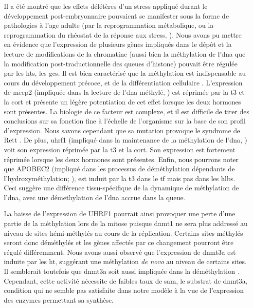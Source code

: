 \documentclass[../main.tex]{subfiles}
\begin{document}
Il a été montré que les effets délétères d'un stress appliqué durant le développement post-embryonnaire pouvaient se manifester sous la forme de pathologies à l'age adulte (par la reprogrammation métabolique, \citealp{Drake2012,Begum2013} ou la reprogrammation du rhéostat de la réponse aux stress, \citealp{Weaver2004}).
Nous avons pu mettre en évidence que l'expression de plusieurs gènes impliqués dans le dépôt et la lecture de modifications de la chromatine (aussi bien la méthylation de l'\gls{dna} que la modification post-traductionnelle des queues d'histone) pouvait être régulée par les \glspl{ht}, les \glspl{gc}.
Il est bien caractérisé que la méthylation est indispensable au cours du développement précoce, et de la différentiation cellulaire \citep{Monk1987,Meissner2008}.
L'expression de \gls{mecp2} (impliquée dans la lecture de l'\gls{dna} méthylé, \citealp{Zou2012}) est réprimée par la \gls{t3} et la \gls{cort} et présente un légère potentiation de cet effet lorsque les deux hormones sont présentes.
La biologie de ce facteur est complexe, et il est difficile de tirer des conclusions sur sa fonction fine à l’échelle de l'organisme sur la base de son profil d'expression.
Nous savons cependant que sa mutation provoque le syndrome de Rett \citep{Amir1999}.
De plus, \gls{uhrf1} (impliqué dans la maintenance de la méthylation de l'\gls{dna}, \citealp{Bostick2007,Liu2013a}) voit son expression réprimée par la \gls{t3} et la \gls{cort}.
Son expression est fortement réprimée lorsque les deux hormones sont présentes.
Enfin, nous pourrons noter que APOBEC2 (impliqué dans les processus de déméthylation dépendants de l'hydroxyméthylation; \citealp{Guo2011}), est induit par la \gls{t3} dans le \gls{tf} mais pas dans les \glspl{hlb}.
Ceci suggère une différence tissu-spécifique de la dynamique de méthylation de l'\gls{dna}, avec une démethylation de l'\gls{dna} accrue dans la queue.
\par
La baisse de l'expression de UHRF1 pourrait ainsi provoquer une perte d'une partie de la méthylation lors de la mitose puisque \gls{dnmt1} ne sera plus addressé au niveau de sites hémi-méthylés au cours de la réplication.
Certains sites méthylés seront donc déméthylés et les gènes affectés par ce changement pourront être régulé différemment.
Nous avons aussi observé que l'expression de \gls{dnmt3a} est induite par les \gls{ht}, suggérant une méthylation \textit{de novo} au niveau de certains sites.
Il semblerait toutefois que \gls{dnmt3a} soit aussi impliquée dans la déméthylation \citep{Wu2010}.
Cependant, cette activité nécessite de faibles taux de \gls{sam}, le substrat de \gls{dnmt3a}, condition qui ne semble pas satisfaite dans notre modèle à la vue de l'expression des enzymes permettant sa synthèse.
\end{document}
